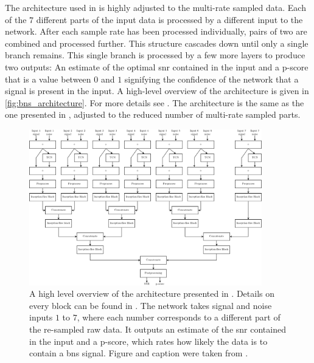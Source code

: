 The architecture used in \cite{Schafer:2020kor} is highly adjusted to the multi-rate sampled data. Each of the $7$ different parts of the input data is processed by a different input to the network. After each sample rate has been processed individually, pairs of two are combined and processed further. This structure cascades down until only a single branch remains. This single branch is processed by a few more layers to produce two outputs: An estimate of the optimal \acrshort{snr} contained in the input and a p-score that is a value between $0$ and $1$ signifying the confidence of the network that a signal is present in the input. A high-level overview of the architecture is given in \autoref{fig:bns_architecture}. For more details see \cite{Schafer:2020kor, Schaefer:2019:MSC}. The architecture is the same as the one presented in \cite{Schaefer:2019:MSC}, adjusted to the reduced number of multi-rate sampled parts.
\begin{figure}
	\centering
	\includegraphics[width=0.9\textwidth]{chapters/bnsnet/images/architecture.png}
	\caption[Architecture]{A high level overview of the architecture presented in \cite{Schafer:2020kor}. Details on every block can be found in \cite{Schaefer:2019:MSC}. The network takes signal and noise inputs $1$ to $7$, where each number corresponds to a different part of the re-sampled raw data. It outputs an estimate of the \acrshort{snr} contained in the input and a p-score, which rates how likely the data is to contain a \acrshort{bns} signal. Figure and caption were taken from \cite{Schafer:2020kor}.}\label{fig:bns_architecture}
\end{figure}

